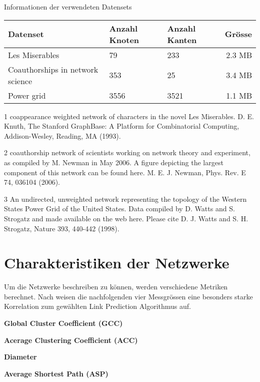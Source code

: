 \begin{threeparttable}
    \centering
    \label{dataset_info}
    \caption{Informationen der verwendeten Datensets}
    \begin{tabular}{@{}lllr@{}}
        \toprule
        Datenset                        & Anzahl Knoten & Anzahl Kanten & Grösse \\ \midrule
        Les Miserables\tnote{1}                 & 79     & 233 & 2.3 MB   \\
        Coauthorships in network science\tnote{2} & 353    & 25 & 3.4 MB     \\
        Power grid\tnote{3}                       & 3556   & 3521 & 1.1 MB   \\ \bottomrule
    \end{tabular}
    \begin{tablenotes}[\flushleft]
        \footnotesize
        \item[1] coappearance weighted network of characters in the novel Les Miserables. D. E. Knuth, The Stanford GraphBase: A Platform for Combinatorial Computing, Addison-Wesley, Reading, MA (1993).
        \item[2] coauthorship network of scientists working on network theory and experiment, as compiled by M. Newman in May 2006. A figure depicting the largest component of this network can be found here. M. E. J. Newman, Phys. Rev. E 74, 036104 (2006).
        \item[3] An undirected, unweighted network representing the topology of the Western States Power Grid of the United States. Data compiled by D. Watts and S. Strogatz and made available on the web here. Please cite D. J. Watts and S. H. Strogatz, Nature 393, 440-442 (1998).
    \end{tablenotes}
\end{threeparttable}

\section{Charakteristiken der Netzwerke}
Um die Netzwerke beschreiben zu können, werden verschiedene Metriken berechnet.
Nach \citeauthor{gao_link_2015} weisen die nachfolgenden vier Messgrössen eine besonders starke Korrelation zum gewählten Link Prediction Algorithmus auf.

\textbf{Global Cluster Coefficient (GCC)}

\textbf{Acerage Clustering Coefficient (ACC)}

\textbf{Diameter}

\textbf{Average Shortest Path (ASP)}
